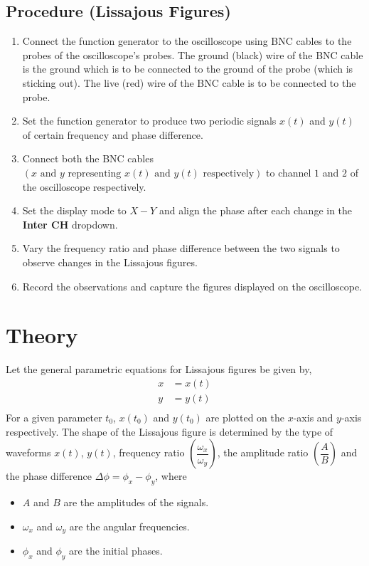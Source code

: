 \documentclass[12pt]{article}
\newcommand{\brak}[1]{\ensuremath{\left(#1\right)}}
\begin{document}
\subsection{Procedure (Lissajous Figures)}
\begin{enumerate}
    \item Connect the function generator to the oscilloscope using BNC cables to the probes of the oscilloscope's probes.
    The ground (black) wire of the BNC cable is the ground which is to be connected to the ground of the probe (which is sticking out). The live (red) wire of the BNC cable is to be connected to the probe.
    \item Set the function generator to produce two periodic signals $x\brak{t}$ and $y\brak{t}$ of certain frequency and phase difference.
    \item Connect both the BNC cables \brak{x \text{ and } y \text{ representing } x\brak{t} \text{ and } y\brak{t} \text{ respectively}} to channel $1$ and $2$ of the oscilloscope respectively.
    \item Set the display mode to $X - Y$ and align the phase after each change in the \textbf{Inter CH} dropdown.
    \item Vary the frequency ratio and phase difference between the two signals to observe changes in the Lissajous figures.
    \item Record the observations and capture the figures displayed on the oscilloscope.
\end{enumerate}

\section{Theory}

Let the general parametric equations for Lissajous figures be given by,
\begin{align}
    x &= x\brak{t}\\
    y &= y\brak{t}\\
\end{align}
For a given parameter $t_0$, $x\brak{t_0}$ and $y\brak{t_0}$ are plotted on the $x$-axis and $y$-axis respectively.
\newline
\newline
The shape of the Lissajous figure is determined by the type of waveforms $x\brak{t}$, $y\brak{t}$, frequency ratio $\brak{\dfrac{\omega_x}{\omega_y}}$, the amplitude ratio $\brak{\dfrac{A}{B}}$ and the phase difference $\Delta \phi = \phi_x - \phi_y$, where
\begin{itemize}
    \item $A$ and $B$ are the amplitudes of the signals.
    \item $\omega_x$ and $\omega_y$ are the angular frequencies.
    \item $\phi_x$ and $\phi_y$ are the initial phases.
\end{itemize}
\end{document}
